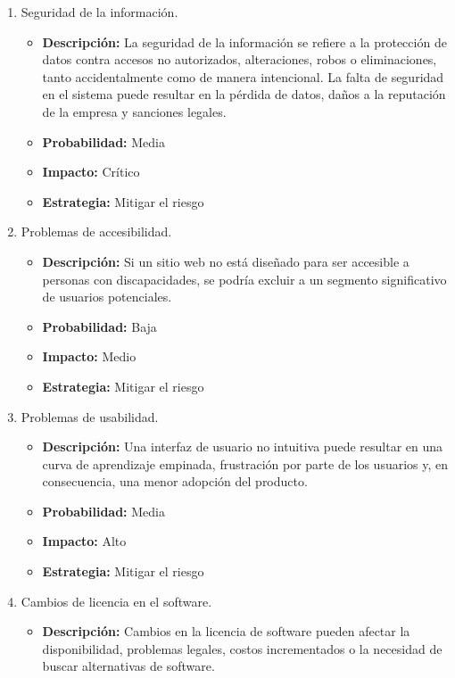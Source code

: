 \begin{enumerate}
    \item Seguridad de la información.
    \begin{itemize}
        \item \textbf{Descripción:} La seguridad de la información se refiere a la protección de datos contra accesos no autorizados, 
        alteraciones, robos o eliminaciones, tanto accidentalmente como de manera intencional. 
        La falta de seguridad en el sistema puede resultar en la pérdida de datos, daños a la reputación de la empresa y sanciones legales. 
        \item \textbf{Probabilidad:} Media
        \item \textbf{Impacto:} Crítico
        \item \textbf{Estrategia:} Mitigar el riesgo
    \end{itemize}
    \item Problemas de accesibilidad.
    \begin{itemize}
        \item \textbf{Descripción:} Si un sitio web no está diseñado para ser accesible a personas con discapacidades, 
        se podría excluir a un segmento significativo de usuarios potenciales.
        \item \textbf{Probabilidad:} Baja
        \item \textbf{Impacto:} Medio
        \item \textbf{Estrategia:} Mitigar el riesgo
    \end{itemize}
    \item Problemas de usabilidad.
    \begin{itemize}
        \item \textbf{Descripción:} Una interfaz de usuario no intuitiva puede resultar en una curva de aprendizaje empinada, 
        frustración por parte de los usuarios y, en consecuencia, una menor adopción del producto.
        \item \textbf{Probabilidad:} Media
        \item \textbf{Impacto:} Alto
        \item \textbf{Estrategia:} Mitigar el riesgo
    \end{itemize}
    \item Cambios de licencia en el software.
    \begin{itemize}
        \item \textbf{Descripción:} Cambios en la licencia de software pueden afectar la disponibilidad, problemas legales, costos incrementados o la necesidad de buscar alternativas de software.

\end{itemize}
\end{enumerate}
